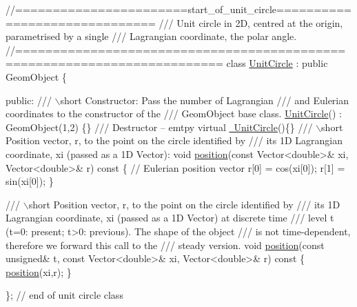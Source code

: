  
\begin{DoxyCodeInclude}
\textcolor{comment}{//=======================start\_of\_unit\_circle==============================}
\textcolor{comment}{/// Unit circle in 2D, centred at the origin, parametrised by a single}
\textcolor{comment}{}\textcolor{comment}{/// Lagrangian coordinate, the polar angle.}
\textcolor{comment}{}\textcolor{comment}{//=========================================================================}
\textcolor{keyword}{class }\hyperlink{classUnitCircle}{UnitCircle} : \textcolor{keyword}{public} GeomObject
\{

 \textcolor{keyword}{public}:
\textcolor{comment}{}
\textcolor{comment}{  /// \(\backslash\)short Constructor: Pass the number of Lagrangian}
\textcolor{comment}{  /// and Eulerian coordinates to the constructor of the}
\textcolor{comment}{  ///  GeomObject base class.}
\textcolor{comment}{}  \hyperlink{classUnitCircle_a494ddf1cb37b659c6f8c44ddde2b9b33}{UnitCircle}() : GeomObject(1,2) \{\}
\textcolor{comment}{}
\textcolor{comment}{  /// Destructor -- emtpy}
\textcolor{comment}{}  \textcolor{keyword}{virtual} \hyperlink{classUnitCircle_a9eb314d8152f5de298e1e155737a69b9}{~UnitCircle}()\{\}
\textcolor{comment}{}
\textcolor{comment}{  /// \(\backslash\)short Position vector, r, to the point on the circle identified by  }
\textcolor{comment}{  /// its 1D Lagrangian coordinate, xi (passed as a 1D Vector):}
\textcolor{comment}{}  \textcolor{keywordtype}{void} \hyperlink{classUnitCircle_adc7fc660ba1d2ecc5bcbe2312e2fb87b}{position}(\textcolor{keyword}{const} Vector<double>& xi, Vector<double>& r)\textcolor{keyword}{ const}
\textcolor{keyword}{  }\{
   \textcolor{comment}{// Eulerian position vector}
   r[0] = cos(xi[0]);
   r[1] = sin(xi[0]);
  \}

\textcolor{comment}{}
\textcolor{comment}{  /// \(\backslash\)short Position vector, r, to the point on the circle identified by  }
\textcolor{comment}{  /// its 1D Lagrangian coordinate, xi (passed as a 1D Vector) at discrete time}
\textcolor{comment}{  /// level t (t=0: present; t>0: previous). The shape of the object }
\textcolor{comment}{  /// is not time-dependent, therefore we forward this call to the }
\textcolor{comment}{  /// steady version. }
\textcolor{comment}{}  \textcolor{keywordtype}{void} \hyperlink{classUnitCircle_adc7fc660ba1d2ecc5bcbe2312e2fb87b}{position}(\textcolor{keyword}{const} \textcolor{keywordtype}{unsigned}& t, \textcolor{keyword}{const} Vector<double>& xi, 
                Vector<double>& r)\textcolor{keyword}{ const}
\textcolor{keyword}{  }\{
   \hyperlink{classUnitCircle_adc7fc660ba1d2ecc5bcbe2312e2fb87b}{position}(xi,r);
  \}

\}; \textcolor{comment}{// end of unit circle class}

\end{DoxyCodeInclude}


